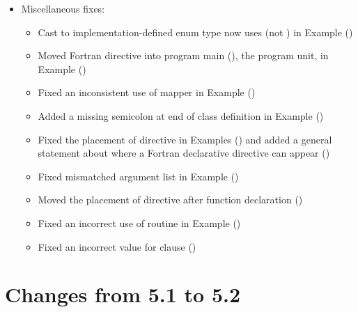 \begin{itemize}
\item Miscellaneous fixes:
\begin{itemize}
  \item Cast to implementation-defined enum type  
    now uses  (not ) in
    Example 
    ()
  \item Moved Fortran  directive into program main (), 
    the program unit, in Example 
    ()
  \item Fixed an inconsistent use of mapper in Example 
    ()
  \item Added a missing semicolon at end of  class definition in
    Example 
    ()
  \item Fixed the placement of  directive in 
    Examples  ()
    and added a general statement about where a Fortran declarative
    directive can appear ()
  \item Fixed mismatched argument list in Example 
    ()
  \item Moved the placement of 
    directive after function declaration
    ()
  \item Fixed an incorrect use of  routine in 
    Example 
    ()
  \item Fixed an incorrect value for  clause
    ()
\end{itemize}

\end{itemize}

\section{Changes from 5.1 to 5.2}
\label{sec:history_51_to_52}

